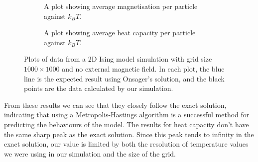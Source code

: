\documentclass[11pt]{article}
\begin{document}
	\begin{figure}[H]\ContinuedFloat
		\begin{subfigure}{0.45\textwidth}
			\begin{center}
			\end{center}
			\caption{A plot showing average magnetisation per particle against $k_BT$.}
		\end{subfigure}
		\begin{subfigure}{0.45\textwidth}
			\begin{center}
			\end{center}
			\caption{A plot showing average heat capacity per particle against $k_BT$.}
		\end{subfigure}
	
		\caption{Plots of data from a 2D Ising model simulation with grid size $1000 \times 1000$ and no external magnetic field. In each plot, the blue line is the expected result using Onsager's solution, and the black points are the data calculated by our simulation.}
		\label{fig:2d_1000_result}
	\end{figure}
	
	From these results we can see that they closely follow the exact solution, indicating that using a Metropolis-Hastings algorithm is a successful method for predicting the behaviours of the model. The results for heat capacity don't have the same sharp peak as the exact solution. Since this peak tends to infinity in the exact solution, our value is limited by both the resolution of temperature values we were using in our simulation and the size of the grid. 
	
\end{document}
